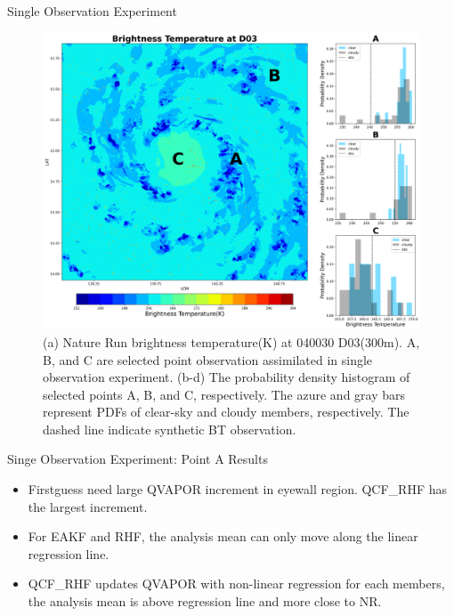 \documentclass[final]{beamer}
\newlength{\colwidth}
\begin{document}
\begin{frame}[t]
\begin{columns}[t]
\begin{column}{\colwidth}
\begin{block}{Single Observation Experiment}
\begin{itemize}
				\end{itemize}
                \begin{figure}
                    \centerline{\includegraphics[width=0.8\colwidth,angle=0]{figure/singleOBS_fig1.png}}
                    \caption{(a) Nature Run brightness temperature(K) at 040030 D03(300m).  A, B, and C are selected point observation assimilated in single observation experiment. (b-d) The probability density histogram of selected points A, B, and C, respectively. The azure and gray bars represent PDFs of clear-sky and cloudy members, respectively. The dashed line indicate synthetic BT observation. }\label{fig1}
                \end{figure}

			\end{block}
			
			\begin{block}{Singe Observation Experiment: Point A Results}
				
                \begin{itemize}
     
					\item Firstguess need large QVAPOR increment in eyewall region. QCF\_RHF has the largest increment.
     
					\item For EAKF and RHF, the analysis mean can only move along the linear regression line.
     
					\item QCF\_RHF updates QVAPOR with non-linear regression for each members, the analysis mean is above regression line and more close to NR.
     

\end{itemize}
\end{block}
\end{column}
\end{columns}
\end{frame}
\end{document}
